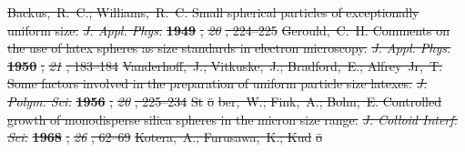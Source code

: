 \documentclass[journal=langd5,manuscript=article]{achemso}
\providecommand{\DIFdel}[1]{{\protect\color{red}\sout{#1}}}                      %
\begin{document}
\DIFdel{Backus,~R.~C.; Williams,~R.~C. Small spherical particles of exceptionally
  uniform size. }\emph{\DIFdel{J. Appl. Phys.}} %
\textbf{\DIFdel{1949}}%
\DIFdel{, }\emph{\DIFdel{20}}%
\DIFdel{, 224--225}%
\DIFdel{Gerould,~C.~H. Comments on the use of latex spheres as size standards in
  electron microscopy. }\emph{\DIFdel{J. Appl. Phys.}} %
\textbf{\DIFdel{1950}}%
\DIFdel{, }\emph{\DIFdel{21}}%
\DIFdel{,
  183--184}%
\DIFdel{Vanderhoff,~J.; Vitkuske,~J.; Bradford,~E.; Alfrey~Jr,~T. Some factors involved
  in the preparation of uniform particle size latexes. }\emph{\DIFdel{J. Polym. Sci.}}
\textbf{\DIFdel{1956}}%
\DIFdel{, }\emph{\DIFdel{20}}%
\DIFdel{, 225--234}%
\DIFdel{St}%
\DIFdel{\"o}%
\DIFdel{ber,~W.; Fink,~A.; Bohn,~E. Controlled growth of monodisperse silica
  spheres in the micron size range. }\emph{\DIFdel{J. Colloid Interf. Sci.}}
\textbf{\DIFdel{1968}}%
\DIFdel{, }\emph{\DIFdel{26}}%
\DIFdel{, 62--69}%
\DIFdel{Kotera,~A.; Furusawa,~K.; Kud}%
\DIFdel{\=o}%
\end{document}
